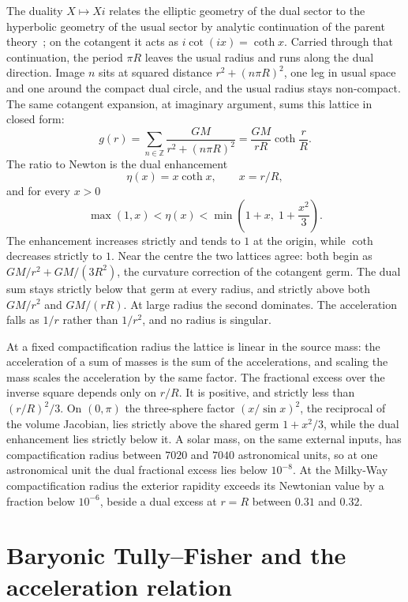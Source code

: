\documentclass[a4paper]{article}
\begin{document}
The duality $X\mapsto Xi$ relates the elliptic geometry of the dual sector to the hyperbolic geometry of the usual sector by analytic continuation of the parent theory~\cite{dst-main}; on the cotangent it acts as $i\cot(ix)=\coth x$. Carried through that continuation, the period $\pi R$ leaves the usual radius and runs along the dual direction. Image $n$ sits at squared distance $r^2+(n\pi R)^2$, one leg in usual space and one around the compact dual circle, and the usual radius stays non-compact. The same cotangent expansion, at imaginary argument, sums this lattice in closed form:
\begin{equation}
\label{eq:dual-lattice}
g(r)=\sum_{n\in\mathbb{Z}}\frac{GM}{r^2+(n\pi R)^2}=\frac{GM}{rR}\coth\frac{r}{R}.
\end{equation}
The ratio to Newton is the dual enhancement
\[
\eta(x)=x\coth x, \qquad x=r/R,
\]
and for every $x>0$
\[
\max(1,x)<\eta(x)<\min\!\left(1+x,\;1+\frac{x^2}{3}\right).
\]
The enhancement increases strictly and tends to $1$ at the origin, while $\coth$ decreases strictly to $1$. Near the centre the two lattices agree: both begin as $GM/r^2+GM/(3R^2)$, the curvature correction of the cotangent germ. The dual sum stays strictly below that germ at every radius, and strictly above both $GM/r^2$ and $GM/(rR)$. At large radius the second dominates. The acceleration falls as $1/r$ rather than $1/r^2$, and no radius is singular.

At a fixed compactification radius the lattice is linear in the source mass: the acceleration of a sum of masses is the sum of the accelerations, and scaling the mass scales the acceleration by the same factor. The fractional excess over the inverse square depends only on $r/R$. It is positive, and strictly less than $(r/R)^2/3$. On $(0,\pi)$ the three-sphere factor $(x/\sin x)^2$, the reciprocal of the volume Jacobian, lies strictly above the shared germ $1+x^2/3$, while the dual enhancement lies strictly below it. A solar mass, on the same external inputs, has compactification radius between $7020$ and $7040$ astronomical units, so at one astronomical unit the dual fractional excess lies below $10^{-8}$. At the Milky-Way compactification radius the exterior rapidity exceeds its Newtonian value by a fraction below $10^{-6}$, beside a dual excess at $r=R$ between $0.31$ and $0.32$.

\section{Baryonic Tully--Fisher and the acceleration relation}
\label{subsec:btfr}
\end{document}
